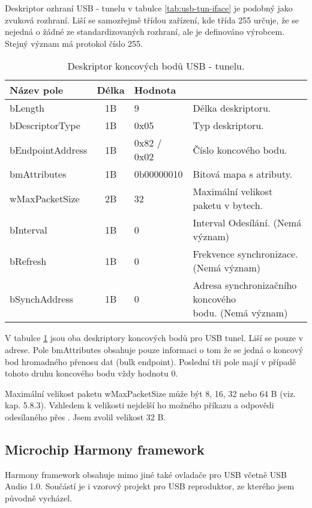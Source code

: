 Deskriptor ozhraní USB - \iic tunelu v tabulce \ref{tab:usb-tun-iface} je podobný jako zvuková rozhraní. Liší se samozřejmě třídou zařízení, kde třída 255 určuje, že se nejedná o žádné ze standardizovaných rozhraní, ale je definováno výrobcem. Stejný význam má protokol číslo 255.

\begin{table}[ht!]
\begin{center}
\begin{tabular}{|l|c|l|l|}
\hline 
Název pole & Délka & Hodnota &  \\ 
\hline
bLength & 1B & 9 & Délka deskriptoru.\\
\hline
bDescriptorType & 1B & 0x05 & Typ deskriptoru. \\
\hline
bEndpointAddress & 1B & 0x82 / 0x02 & Číslo koncového bodu. \\
\hline
bmAttributes & 1B & 0b00000010 & Bitová mapa s atributy.\\
\hline
wMaxPacketSize & 2B & 32 & Maximální velikost paketu v bytech.\\ 
\hline
bInterval & 1B & 0 & Interval Odesílání. (Nemá význam) \\ 
\hline
bRefresh & 1B & 0 & Frekvence synchronizace. (Nemá význam) \\
\hline 
bSynchAddress & 1B & 0 & \makecell[l]{Adresa synchronizačního koncového\\ bodu. (Nemá význam)} \\ 
\hline
\end{tabular} 
\end{center}
\caption{Deskriptor koncových bodů USB - \iic tunelu.}
\label{tab:usb-tun-ep} 
\end{table}

V tabulce \ref{tab:usb-tun-ep} jsou oba deskriptory koncových bodů pro USB \iic tunel. Liší se pouze v adrese. Pole bmAttributes obsahuje pouze informaci o tom že se jedná o koncový bod hromadného přenosu dat (bulk endpoint). Poslední tři pole mají v případě tohoto druhu koncového bodu vždy hodnotu 0. 

Maximální velikost paketu wMaxPacketSize může být 8, 16, 32 nebo 64 B (viz. \cite{usb-spec} kap. 5.8.3). Vzhledem k velikosti nejdelší ho možného příkazu a odpovědi odesílaného přes \iic. Jsem zvolil velikost 32 B.

\subsection{Microchip Harmony framework}
Harmony framework obsahuje mimo jiné také ovladače pro USB včetně USB Audio 1.0. Součástí je i vzorový projekt pro USB reproduktor, ze kterého jsem původně vycházel. 

